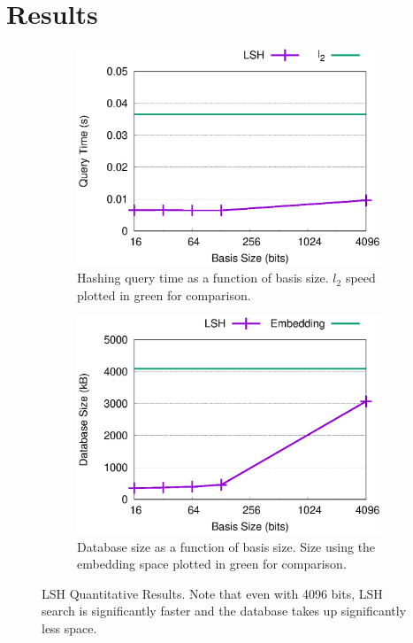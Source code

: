 \section{Results}\label{sec:results}

\begin{figure}[t]
    \centering
    \begin{subfigure}[t]{0.24\textwidth}
        \includegraphics[width=\textwidth]{images/hashing_time_results.eps}
        \caption{Hashing query time as a function of basis size. $l_2$ speed plotted in green for comparison.}
    \end{subfigure} 
    \begin{subfigure}[t]{0.24\textwidth}
        \includegraphics[width=\textwidth]{images/hashing_memory_results.eps}
        \caption{Database size as a function of basis size. Size using the embedding space plotted in green for comparison.}
    \end{subfigure}
    \caption{LSH Quantitative Results. Note that even with 4096 bits, LSH search is significantly faster and the database takes up significantly less space.}
    \label{fig:lshres}
\end{figure}


